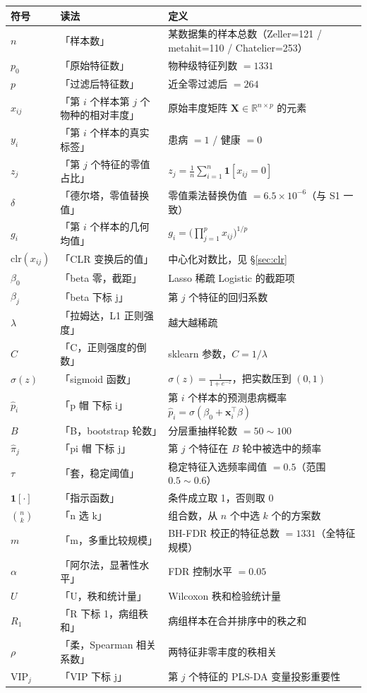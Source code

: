 \documentclass{internal-report}
\begin{document}
\begin{center}
\footnotesize
\begin{tabular}{lll}
\toprule
符号 & 读法 & 定义 \\
\midrule
$n$ & 「样本数」 & 某数据集的样本总数（Zeller=121 / metahit=110 / Chatelier=253） \\
$p_0$ & 「原始特征数」 & 物种级特征列数 $=1331$ \\
$p$ & 「过滤后特征数」 & 近全零过滤后 $=264$ \\
$x_{ij}$ & 「第 $i$ 个样本第 $j$ 个物种的相对丰度」 & 原始丰度矩阵 $\mathbf{X}\in\mathbb{R}^{n\times p}$ 的元素 \\
$y_i$ & 「第 $i$ 个样本的真实标签」 & 患病 $=1$ / 健康 $=0$ \\
$z_j$ & 「第 $j$ 个特征的零值占比」 & $z_j=\frac{1}{n}\sum_{i=1}^{n}\mathbf{1}[x_{ij}=0]$ \\
$\delta$ & 「德尔塔，零值替换值」 & 零值乘法替换伪值 $=6.5\times10^{-6}$（与 S1 一致） \\
$g_i$ & 「第 $i$ 个样本的几何均值」 & $g_i=\big(\prod_{j=1}^{p}x_{ij}\big)^{1/p}$ \\
$\mathrm{clr}(x_{ij})$ & 「CLR 变换后的值」 & 中心化对数比，见 \S\ref{sec:clr} \\
$\beta_0$ & 「beta 零，截距」 & Lasso 稀疏 Logistic 的截距项 \\
$\beta_j$ & 「beta 下标 j」 & 第 $j$ 个特征的回归系数 \\
$\lambda$ & 「拉姆达，L1 正则强度」 & 越大越稀疏 \\
$C$ & 「C，正则强度的倒数」 & sklearn 参数，$C=1/\lambda$ \\
$\sigma(z)$ & 「sigmoid 函数」 & $\sigma(z)=\frac{1}{1+e^{-z}}$，把实数压到 $(0,1)$ \\
$\hat{p}_i$ & 「p 帽 下标 i」 & 第 $i$ 个样本的预测患病概率 $\hat{p}_i=\sigma(\beta_0+\mathbf{x}_i^{\top}\beta)$ \\
$B$ & 「B，bootstrap 轮数」 & 分层重抽样轮数 $=50\sim100$ \\
$\hat{\pi}_j$ & 「pi 帽 下标 j」 & 第 $j$ 个特征在 $B$ 轮中被选中的频率 \\
$\tau$ & 「套，稳定阈值」 & 稳定特征入选频率阈值 $=0.5$（范围 $0.5\sim0.6$） \\
$\mathbf{1}[\cdot]$ & 「指示函数」 & 条件成立取 1，否则取 0 \\
$\binom{n}{k}$ & 「n 选 k」 & 组合数，从 $n$ 个中选 $k$ 个的方案数 \\
$m$ & 「m，多重比较规模」 & BH-FDR 校正的特征总数 $=1331$（全特征规模） \\
$\alpha$ & 「阿尔法，显著性水平」 & FDR 控制水平 $=0.05$ \\
$U$ & 「U，秩和统计量」 & Wilcoxon 秩和检验统计量 \\
$R_1$ & 「R 下标 1，病组秩和」 & 病组样本在合并排序中的秩之和 \\
$\rho$ & 「柔，Spearman 相关系数」 & 两特征非零丰度的秩相关 \\
$\mathrm{VIP}_j$ & 「VIP 下标 j」 & 第 $j$ 个特征的 PLS-DA 变量投影重要性 \\
\bottomrule
\end{tabular}
\end{center}
\end{document}
